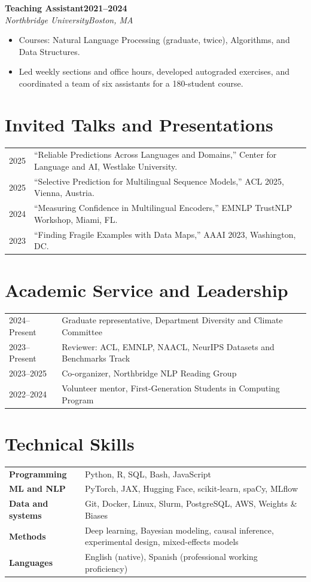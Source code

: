 \documentclass[10pt,letterpaper]{article}
\newcommand{\cventry}[4]{%
  \textbf{#1}\hfill\textbf{#2}\\[-1pt]
  \textit{#3}\hfill\textit{#4}\par
}
\begin{document}
\vspace{2pt}
\cventry{Teaching Assistant}{2021--2024}{Northbridge University}{Boston, MA}
\begin{itemize}
  \item Courses: Natural Language Processing (graduate, twice), Algorithms, and Data Structures.
  \item Led weekly sections and office hours, developed autograded exercises, and coordinated a team of
        six assistants for a 180-student course.
\end{itemize}

\section*{Invited Talks and Presentations}
\begin{tabularx}{\textwidth}{@{}p{4.4em}X@{}}
2025 & ``Reliable Predictions Across Languages and Domains,'' Center for Language and AI,
       Westlake University.\\
2025 & ``Selective Prediction for Multilingual Sequence Models,'' ACL 2025, Vienna, Austria.\\
2024 & ``Measuring Confidence in Multilingual Encoders,'' EMNLP TrustNLP Workshop, Miami, FL.\\
2023 & ``Finding Fragile Examples with Data Maps,'' AAAI 2023, Washington, DC.
\end{tabularx}

\section*{Academic Service and Leadership}
\begin{tabularx}{\textwidth}{@{}p{6.2em}X@{}}
2024--Present & Graduate representative, Department Diversity and Climate Committee\\
2023--Present & Reviewer: ACL, EMNLP, NAACL, NeurIPS Datasets and Benchmarks Track\\
2023--2025 & Co-organizer, Northbridge NLP Reading Group\\
2022--2024 & Volunteer mentor, First-Generation Students in Computing Program
\end{tabularx}

\section*{Technical Skills}
\begin{tabularx}{\textwidth}{@{}>{\bfseries}p{9.8em}X@{}}
Programming & Python, R, SQL, Bash, JavaScript\\
ML and NLP & PyTorch, JAX, Hugging Face, scikit-learn, spaCy, MLflow\\
Data and systems & Git, Docker, Linux, Slurm, PostgreSQL, AWS, Weights \& Biases\\
Methods & Deep learning, Bayesian modeling, causal inference, experimental design, mixed-effects models\\
Languages & English (native), Spanish (professional working proficiency)
\end{tabularx}
\end{document}
